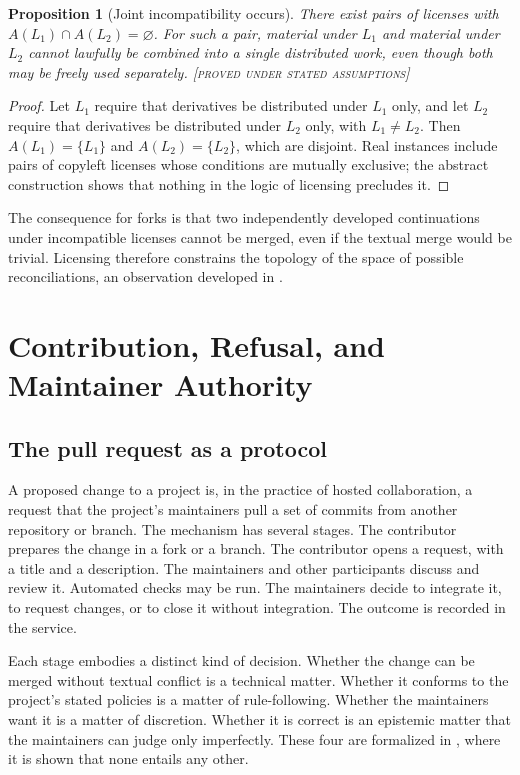 \documentclass[11pt,twoside,openright]{book}
\theoremstyle{plain}
\newtheorem{proposition}[theorem]{Proposition}
\theoremstyle{definition}
\theoremstyle{remark}
\newcommand{\Proved}{\textup{\textsc{[proved under stated assumptions]}}}
\begin{document}
\begin{proposition}[Joint incompatibility occurs]\label{prop:incompat}
There exist pairs of licenses with $A(L_1)\cap A(L_2)=\varnothing$. For such a pair, material under $L_1$ and material under $L_2$ cannot lawfully be combined into a single distributed work, even though both may be freely used separately.
\Proved{}
\end{proposition}

\begin{proof}
Let $L_1$ require that derivatives be distributed under $L_1$ only, and let $L_2$ require that derivatives be distributed under $L_2$ only, with $L_1\neq L_2$. Then $A(L_1)=\{L_1\}$ and $A(L_2)=\{L_2\}$, which are disjoint. Real instances include pairs of copyleft licenses whose conditions are mutually exclusive; the abstract construction shows that nothing in the logic of licensing precludes it.
\end{proof}

The consequence for forks is that two independently developed continuations under incompatible licenses cannot be merged, even if the textual merge would be trivial. Licensing therefore constrains the topology of the space of possible reconciliations, an observation developed in .

\chapter{Contribution, Refusal, and Maintainer Authority}\label{ch:contribution}

\section{The pull request as a protocol}

A proposed change to a project is, in the practice of hosted collaboration, a request that the project's maintainers pull a set of commits from another repository or branch. The mechanism has several stages. The contributor prepares the change in a fork or a branch. The contributor opens a request, with a title and a description. The maintainers and other participants discuss and review it. Automated checks may be run. The maintainers decide to integrate it, to request changes, or to close it without integration. The outcome is recorded in the service.

Each stage embodies a distinct kind of decision. Whether the change can be merged without textual conflict is a technical matter. Whether it conforms to the project's stated policies is a matter of rule-following. Whether the maintainers want it is a matter of discretion. Whether it is correct is an epistemic matter that the maintainers can judge only imperfectly. These four are formalized in , where it is shown that none entails any other.
\end{document}
